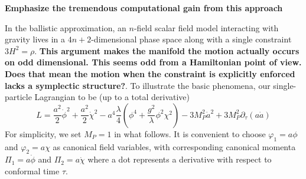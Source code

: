 {\bf Emphasize the tremendous computational gain from this approach}

In the ballistic approximation, an $n$-field scalar field model interacting with gravity lives in a $4n+2$-dimensional phase space along with a single constraint $3H^2 = \rho$. {\bf This argument makes the manifold the motion actually occurs on odd dimensional.  This seems odd from a Hamiltonian point of view.  Does that mean the motion when the constraint is explicitly enforced lacks a symplectic structure?}.
To illustrate the basic phenomena, our single-particle Lagrangian to be (up to a total derivative)
\begin{equation}
  L = \frac{a^2}{2}\dot{\phi}^2 + \frac{a^2}{2}\dot{\chi}^2 - a^4\frac{\lambda}{4}\left(\phi^4 + \frac{g^2}{\lambda}\phi^2\chi^2\right) - 3M_P^2\dot{a}^2 + 3M_P^2\partial_\tau(a\dot{a})
\end{equation}
For simplicity, we set $M_P=1$ in what follows.  It is convenient to choose $\varphi_1 = a\phi$ and $\varphi_2 = a\chi$ as canonical field variables, with corresponding canonical momenta $\Pi_1 = a\dot{\phi}$ and $\Pi_2=a\dot{\chi}$ where a dot represents a derivative with respect to conformal time $\tau$.

